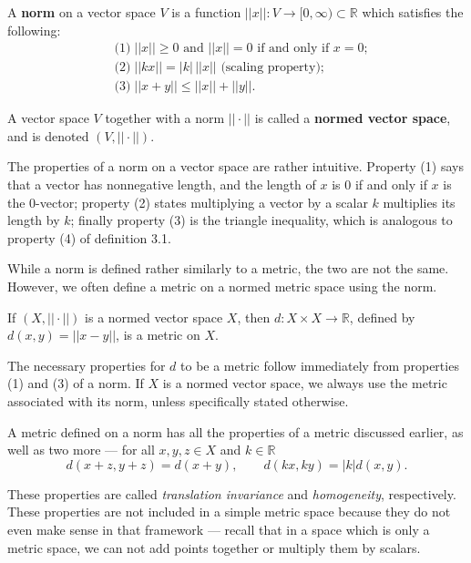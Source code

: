 \begin{defn}
A \textbf{norm} on a vector space $V$ is a function $||x||: V \rightarrow [0, \infty) \subset \mathbb{R}$ which satisfies the following:
\begin{align*}
&\textrm{(1)}\; ||x|| \geq 0 \textrm{ and } ||x|| = 0 \textrm{ if and only if } x=0;\\
&\textrm{(2)}\; ||kx|| = |k|\,||x|| \textrm{ (scaling property)};\\
&\textrm{(3)}\; ||x + y|| \leq ||x|| + ||y||.
\end{align*}

A vector space $V$ together with a norm $||\cdot||$ is called a \textbf{normed vector space}, and is denoted $(V, ||\cdot||)$.
\end{defn}

The properties of a norm on a vector space are rather intuitive.  Property (1) says that a vector has nonnegative length, and the length of $x$ is 0 if and only if $x$ is the 0-vector; property (2) states multiplying a vector by a scalar $k$ multiplies its length by $k$; finally property (3) is the triangle inequality, which is analogous to property (4) of definition 3.1.

While a norm is defined rather similarly to a metric, the two are not the same.  However, we often define a metric on a normed metric space using the norm.

\begin{prop}
If $(X, ||\cdot||)$ is a normed vector space $X$, then $d: X \times X \rightarrow \mathbb{R}$, defined by $d(x,y) = ||x - y||$, is a metric on $X$.
\end{prop}

The necessary properties for $d$ to be a metric follow immediately from properties (1) and (3) of a norm.  If $X$ is a normed vector space, we always use the metric associated with its norm, unless specifically stated otherwise.

A metric defined on a norm has all the properties of a metric discussed earlier, as well as two more --- for all $x, y, z \in X$ and $k \in \mathbb{R}$
\[d(x+z, y+z) = d(x+y), \qquad d(kx, ky) = |k|d(x,y).\]

These properties are called \textit{translation invariance} and \textit{homogeneity}, respectively.  These properties are not included in a simple metric space because they do not even make sense in that framework --- recall that in a space which is only a metric space, we can not add points together or multiply them by scalars.

